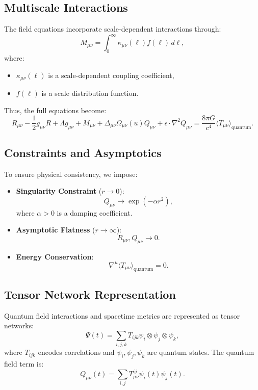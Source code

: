 \documentclass[12]{amsart}
\theoremstyle{plain}
\begin{document}
\subsection{Multiscale Interactions}
The field equations incorporate scale-dependent interactions through:
\begin{equation}
    M_{\mu\nu} = \int_{0}^{\infty} \kappa_{\mu\nu}(\ell) f(\ell) \, d\ell,
\end{equation}
where:
\begin{itemize}
    \item \( \kappa_{\mu\nu}(\ell) \) is a scale-dependent coupling coefficient,
    \item \( f(\ell) \) is a scale distribution function.
\end{itemize}
Thus, the full equations become:
\begin{equation}
    R_{\mu\nu} - \frac{1}{2} g_{\mu\nu} R + \Lambda g_{\mu\nu} + M_{\mu\nu} + \Delta_{\mu\nu} \Omega_{\mu\nu}(u) Q_{\mu\nu} + \epsilon \cdot \nabla^2 Q_{\mu\nu} = \frac{8 \pi G}{c^4} \langle T_{\mu\nu} \rangle_{\text{quantum}}.
\end{equation}

\subsection{Constraints and Asymptotics}
To ensure physical consistency, we impose:
\begin{itemize}
    \item \textbf{Singularity Constraint} (\( r \to 0 \)):
    \begin{equation}
        Q_{\mu\nu} \to \exp(-\alpha r^2),
    \end{equation}
    where \( \alpha > 0 \) is a damping coefficient.
    \item \textbf{Asymptotic Flatness} (\( r \to \infty \)):
    \begin{equation}
        R_{\mu\nu}, Q_{\mu\nu} \to 0.
    \end{equation}
    \item \textbf{Energy Conservation}:
    \begin{equation}
        \nabla^\mu \langle T_{\mu\nu} \rangle_{\text{quantum}} = 0.
    \end{equation}
\end{itemize}

\subsection{Tensor Network Representation}
Quantum field interactions and spacetime metrics are represented as tensor networks:
\begin{equation}
    \Psi(t) = \sum_{i,j,k} T_{ijk} \psi_i \otimes \psi_j \otimes \psi_k,
\end{equation}
where \( T_{ijk} \) encodes correlations and \( \psi_i, \psi_j, \psi_k \) are quantum states. The quantum field term is:
\begin{equation}
    Q_{\mu\nu}(t) = \sum_{i,j} T_{\mu\nu}^{ij} \psi_i(t) \psi_j(t).
\end{equation}
\end{document}
